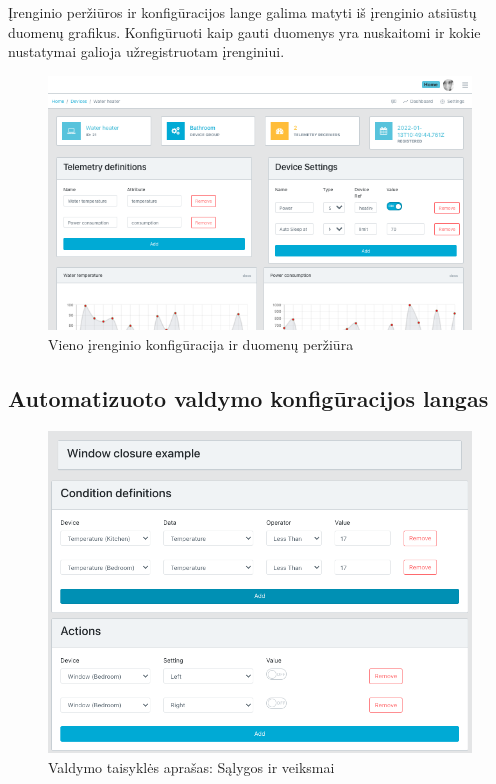 \documentclass{VUMIFInfBakalaurinis}
\begin{document}
Įrenginio peržiūros ir konfigūracijos lange galima matyti iš įrenginio atsiūstų duomenų grafikus.
Konfigūruoti kaip gauti duomenys yra nuskaitomi ir kokie nustatymai galioja užregistruotam įrenginiui. 

\begin{figure}[H]
    \centering
    \includegraphics[scale=0.6]{img/device-settings-results}
    \caption{Vieno įrenginio konfigūracija ir duomenų peržiūra}   %
    \label{img:mlp}
\end{figure}

\subsection{Automatizuoto valdymo konfigūracijos langas}
\begin{figure}[H]
  \centering
  \includegraphics[scale=0.6]{img/window-closure-example}
  \caption{Valdymo taisyklės aprašas: Sąlygos ir veiksmai}   %
  \label{img:mlp}
\end{figure}
\end{document}
